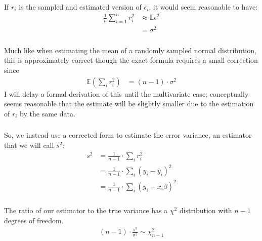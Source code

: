 \begin{frame}[fragile] \frametitle{}

If $r_i$ is the sampled and estimated version of $\epsilon_i$,
it would seem reasonable to have:
\begin{align*}
\frac{1}{n} \sum_{i=1}^n r_i^2 &\approx \mathbb{E} \epsilon^2 \\
&= \sigma^2
\end{align*}

\end{frame}

\begin{frame}[fragile] \frametitle{}

Much like when estimating the mean of a randomly sampled normal
distribution, this is approximately correct though the exact
formula requires a small correction since\pause
\begin{align*}
\mathbb{E} \left( \sum_i r_i^2 \right) &= (n-1) \cdot \sigma^2
\end{align*}
\pause I will delay a formal derivation of this until the multivariate
case; conceptually seems reasonable that the estimate will be slightly
smaller due to the estimation of $r_i$ by the same data.

\end{frame}


\begin{frame}[fragile] \frametitle{}

So, we instead use a corrected form to estimate the error
variance, an estimator that we will call $s^2$:
\begin{align*}
s^2 &= \frac{1}{n-1} \cdot \sum_i r_i^2 \\
&= \frac{1}{n-1} \cdot \sum_i (y_i - \widehat{y}_i)^2 \\
&= \frac{1}{n-1} \cdot \sum_i (y_i - x_i \beta)^2
\end{align*}

\end{frame}

\begin{frame}[fragile] \frametitle{}

The ratio of our estimator to the true variance has
a $\chi^2$ distribution with $n-1$ degrees of freedom.
\begin{align*}
(n-1) \cdot \frac{s^2}{\sigma^2} \sim \chi^2_{n - 1}
\end{align*}

\end{frame}

